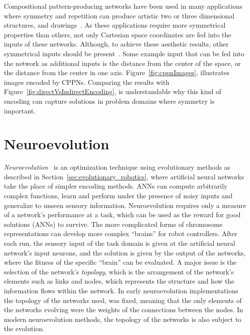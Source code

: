 
Compositional pattern-producing networks have been used in many applications where symmetry and repetition can produce artistic two or three dimensional structures\footnotemark[2], and drawings\footnotemark[1]~\citep{secretan2008picbreeder}. As these applications require more symmetrical properties than others, not only Cartesian space coordinates are fed into the inputs of these networks. Although, to achieve these aesthetic results, other symmetrical inputs should be present~\citep{secretan2008picbreeder}. Some example input that can be fed into the network as additional inputs is the distance from the center of the space, or the distance from the center in one axis. Figure~\ref{fig:cppnImages}, illustrates images encoded by CPPNs. Comparing the results with Figure~\ref{fig:directVsIndirectEncoding}, is understandable why this kind of encoding can capture solutions in problem domains where symmetry is important.




\section{Neuroevolution}

\emph{Neuroevolution}~\citep{yao1997new} is an optimization technique using evolutionary methods as described in Section~\ref{sec:evolutionary_robotics}, where artificial neural networks take the place of simpler encoding methods. ANNs can compute arbitrarily complex functions, learn and perform under the presence of noisy inputs and generalize to unseen sensory information. Neuroevolution requires only a measure of a network's performance at a task, which can be used as the reward for good solutions (ANNs) to survive. The more complicated forms of chromosome representations can develop more complex ``brains'' for robot controllers. After each run, the sensory input of the task domain is given at the artificial neural network's input neurons, and the solution is given by the output of the networks, where the fitness of the specific ``brain'' can be evaluated. A major issue is the selection of the network's \emph{topology}, which is the arrangement of the network's elements such as links and nodes, which represents the structure and how the information flows within the network. In early neuroevolution implementations the topology of the networks used, was fixed, meaning that the only elements of the networks evolving were the weights of the connections between the nodes. In modern neuroevolution methods, the topology of the networks is also subject to the evolution.

